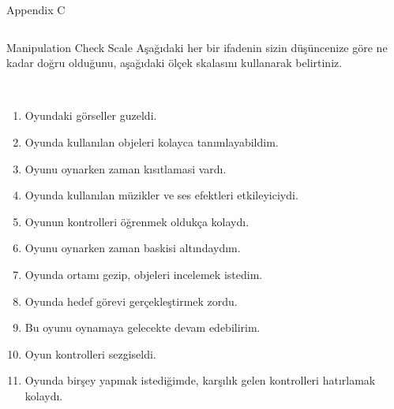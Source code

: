 \documentclass{beamer}
\begin{document}
\begin{frame}[label=appC, plain]{Appendix C}
  \begin{columns}[t]
    \begin{exampleblock}{Manipulation Check Scale}
     \fontsize{6pt}{7.2}\selectfont
      Aşağıdaki her bir ifadenin sizin düşüncenize göre ne kadar doğru olduğunu, aşağıdaki ölçek skalasını kullanarak belirtiniz.\\

\hspace{1.5cm} \par
\hspace{1cm} \\
\fontsize{8pt}{7.2}\selectfont
\begin{enumerate}
\item Oyundaki görseller guzeldi.
\item Oyunda kullanılan objeleri kolayca tanımlayabildim.
\item \alert{Oyunu oynarken zaman kısıtlamasi vardı.}
\item Oyunda kullanılan müzikler ve ses efektleri etkileyiciydi.
\item Oyunun kontrolleri öğrenmek oldukça kolaydı.
\item \alert{Oyunu oynarken zaman baskisi altındaydım.}
\item Oyunda ortamı gezip, objeleri incelemek istedim.
\item \alert{Oyunda hedef görevi gerçekleştirmek zordu.}
\item Bu oyunu oynamaya gelecekte devam edebilirim.
\item Oyun kontrolleri sezgiseldi.
\item Oyunda birşey yapmak istediğimde, karşılık gelen kontrolleri hatırlamak kolaydı.
\end{enumerate}
    \end{exampleblock}
  \end{columns}  
\end{frame}
\end{document}
